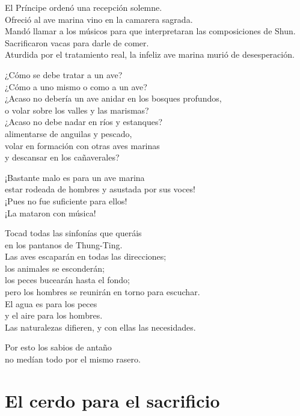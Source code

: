\documentclass[book,b5paper,hidelinks,final]{memoir}
\begin{document}
	El Príncipe ordenó una recepción solemne.\\
	Ofreció al ave marina vino en la camarera sagrada.\\
	Mandó llamar a los músicos para que interpretaran las composiciones de
	Shun.\\
	Sacrificaron vacas para darle de comer.\\
	Aturdida por el tratamiento real, la infeliz ave marina murió de
	desesperación.
	
	¿Cómo se debe tratar a un ave?\\
	¿Cómo a uno mismo o como a un ave?\\
	¿Acaso no debería un ave anidar en los bosques profundos,\\
	o volar sobre los valles y las marismas?\\
	¿Acaso no debe nadar en ríos y estanques?\\
	alimentarse de anguilas y pescado,\\
	volar en formación con otras aves marinas\\
	y descansar en los cañaverales?
	
	¡Bastante malo es para un ave marina\\
	estar rodeada de hombres y asustada por sus voces!\\
	¡Pues no fue suficiente para ellos!\\
	¡La mataron con música!
	
	Tocad todas las sinfonías que queráis\\
	en los pantanos de Thung-Ting.\\
	Las aves escaparán en todas las direcciones;\\
	los animales se esconderán;\\
	los peces bucearán hasta el fondo;\\
	pero los hombres se reunirán en torno para escuchar.\\
	El agua es para los peces\\
	y el aire para los hombres.\\
	Las naturalezas difieren, y con ellas las necesidades.
	
	Por esto los sabios de antaño\\
	no medían todo por el mismo rasero.
	
	\chapter*{El cerdo para el sacrificio}
	
\end{document}
